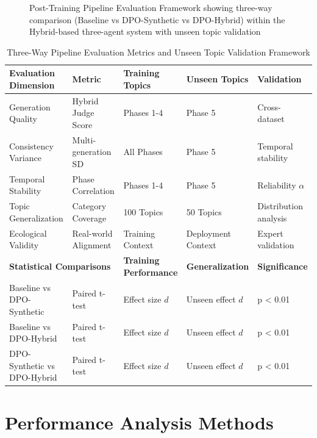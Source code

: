 \begin{figure}[htbp]
    \centering
    \caption{Post-Training Pipeline Evaluation Framework showing three-way comparison (Baseline vs DPO-Synthetic vs DPO-Hybrid) within the Hybrid-based three-agent system with unseen topic validation}
    \label{fig:post-training-pipeline}
\end{figure}

\begin{table}[htbp]
    \centering
    \caption{Three-Way Pipeline Evaluation Metrics and Unseen Topic Validation Framework}
    \label{tab:pipeline-evaluation-metrics}
    \begin{tabular}{|l|l|l|l|l|}
    \hline
    \textbf{Evaluation Dimension} & \textbf{Metric} & \textbf{Training Topics} & \textbf{Unseen Topics} & \textbf{Validation} \\
    \hline
    Generation Quality & Hybrid Judge Score & Phases 1-4 & Phase 5 & Cross-dataset \\
    Consistency Variance & Multi-generation SD & All Phases & Phase 5 & Temporal stability \\
    Temporal Stability & Phase Correlation & Phases 1-4 & Phase 5 & Reliability \(\alpha\) \\
    Topic Generalization & Category Coverage & 100 Topics & 50 Topics & Distribution analysis \\
    Ecological Validity & Real-world Alignment & Training Context & Deployment Context & Expert validation \\
    \hline
    \multicolumn{2}{|l|}{\textbf{Statistical Comparisons}} & \textbf{Training Performance} & \textbf{Generalization} & \textbf{Significance} \\
    \hline
    Baseline vs DPO-Synthetic & Paired t-test & Effect size \(d\) & Unseen effect \(d\) & p < 0.01 \\
    Baseline vs DPO-Hybrid & Paired t-test & Effect size \(d\) & Unseen effect \(d\) & p < 0.01 \\
    DPO-Synthetic vs DPO-Hybrid & Paired t-test & Effect size \(d\) & Unseen effect \(d\) & p < 0.01 \\
    \hline
    \end{tabular}
\end{table}

\section{Performance Analysis Methods}
\label{sec:performance-analysis}

